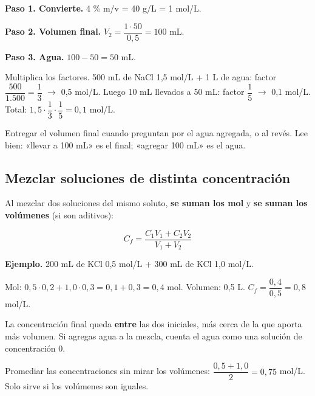  

\textbf{Paso 1. Convierte.} 4 \% m/v = 40 g/L = 1 mol/L.

 

\textbf{Paso 2. Volumen final.} $V_2 = \dfrac{1\cdot 50}{0{,}5} = 100$ mL.

 

\textbf{Paso 3. Agua.} $100 - 50 = 50$ mL.

  
\begin{clave} Multiplica los factores. 500 mL de NaCl 1,5 mol/L + 1 L de agua: factor $\dfrac{500}{1.500} = \dfrac{1}{3}$ \ensuremath{\rightarrow} 0,5 mol/L. Luego 10 mL llevados a 50 mL: factor $\dfrac{1}{5}$ \ensuremath{\rightarrow} 0,1 mol/L. Total: $1{,}5\cdot\dfrac{1}{3}\cdot\dfrac{1}{5} = 0{,}1$ mol/L.\end{clave}
 
\begin{ojo} Entregar el volumen final cuando preguntan por el agua agregada, o al revés. Lee bien: «llevar a 100 mL» es el final; «agregar 100 mL» es el agua.\end{ojo}
\subsection{Mezclar soluciones de distinta concentración}
Al mezclar dos soluciones del mismo soluto, \textbf{se suman los mol} y \textbf{se suman los volúmenes} (si son aditivos):

 \[ C_f = \dfrac{C_1 V_1 + C_2 V_2}{V_1 + V_2} \] 

\textbf{Ejemplo.} 200 mL de KCl 0,5 mol/L + 300 mL de KCl 1,0 mol/L.

 

Mol: $0{,}5\cdot 0{,}2 + 1{,}0\cdot 0{,}3 = 0{,}1 + 0{,}3 = 0{,}4$ mol. Volumen: 0,5 L. $C_f = \dfrac{0{,}4}{0{,}5} = 0{,}8$ mol/L.

  
\begin{clave} La concentración final queda \textbf{entre} las dos iniciales, más cerca de la que aporta más volumen. Si agregas agua a la mezcla, cuenta el agua como una solución de concentración 0.\end{clave}
 
\begin{ojo} Promediar las concentraciones sin mirar los volúmenes: $\dfrac{0{,}5 + 1{,}0}{2} = 0{,}75$ mol/L. Solo sirve si los volúmenes son iguales.\end{ojo}
 
